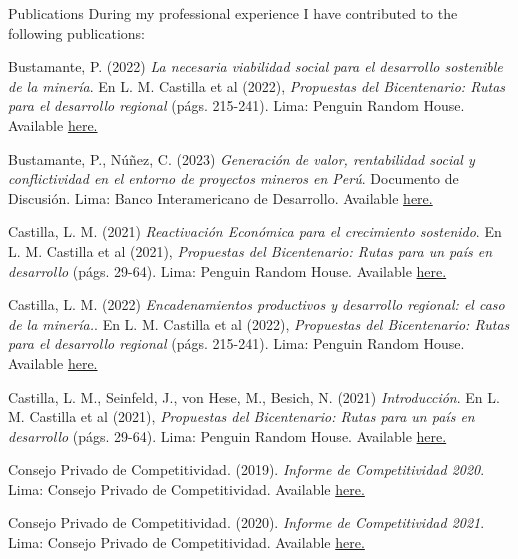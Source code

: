 \documentclass{resume} %
\begin{document}
\begin{rSection}{Publications}
During my professional experience I have contributed to the following publications:
\item Bustamante, P. (2022) \emph{La necesaria viabilidad social para el desarrollo sostenible de la minería}. En L. M. Castilla et al (2022), \textit{Propuestas del Bicentenario: Rutas para el desarrollo regional} (págs. 215-241). Lima: Penguin Random House. Available \href{https://www.casadellibro.com/ebook-propuestas-del-bicentenario-ebook/9786125068026/13125397}{here.}
\item Bustamante, P., Núñez, C. (2023) \emph{Generación de valor, rentabilidad social y conflictividad en el entorno de proyectos mineros en Perú}. Documento de Discusión. Lima: Banco Interamericano de Desarrollo. Available \href{https://www.casadellibro.com/ebook-propuestas-del-bicentenario-ebook/9786125068026/13125397}{here.}
\item Castilla, L. M. (2021) \emph{Reactivación Económica para el crecimiento sostenido}. En L. M. Castilla et al (2021), \textit{Propuestas del Bicentenario: Rutas para un país en desarrollo} (págs. 29-64). Lima: Penguin Random House. Available \href{https://www.casadellibro.com/ebook-propuestas-del-bicentenario-ebook/9786124272813/12336851}{here.}
\item Castilla, L. M. (2022) \emph{Encadenamientos productivos y desarrollo regional: el caso de la minería.}.  En L. M. Castilla et al (2022), \textit{Propuestas del Bicentenario: Rutas para el desarrollo regional} (págs. 215-241). Lima: Penguin Random House. Available \href{https://www.casadellibro.com/ebook-propuestas-del-bicentenario-ebook/9786125068026/13125397}{here.} 
\item Castilla, L. M., Seinfeld, J., von Hese, M., Besich, N. (2021) \emph{Introducción}. En L. M. Castilla et al (2021), \textit{Propuestas del Bicentenario: Rutas para un país en desarrollo} (págs. 29-64). Lima: Penguin Random House. Available \href{https://www.casadellibro.com/ebook-propuestas-del-bicentenario-ebook/9786124272813/12336851}{here.}
\item Consejo Privado de Competitividad. (2019). \emph{Informe de Competitividad 2020}. Lima: Consejo Privado de Competitividad. Available \href{https://www.compite.pe/wp-content/uploads/2019/11/CPC_Peru_INC-2020_Libro-Web-Paginas.pdf}{here.}
\item Consejo Privado de Competitividad. (2020). \emph{Informe de Competitividad 2021}. Lima: Consejo Privado de Competitividad. Available \href{https://www.compite.pe/wp-content/uploads/2021/01/Informe-de-Competitividad-2021-CPC.pdf}{here.}
\end{rSection} 
\end{document}
